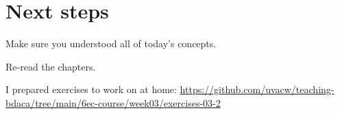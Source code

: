 \section{Next steps}

\begin{frame}[standout]
Make sure you understood all of today's concepts.

Re-read the chapters.

I prepared exercises to work on at home:
\large{\url{https://github.com/uvacw/teaching-bdaca/tree/main/6ec-course/week03/exercises-03-2}}
\end{frame}


\begin{frame}
	\printbibliography
\end{frame}




